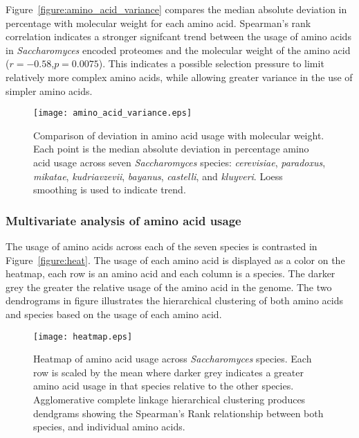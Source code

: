 Figure~\vref{figure:amino_acid_variance} compares the median absolute deviation in percentage with molecular weight for each amino acid. Spearman's rank correlation indicates a stronger signifcant trend between the usage of amino acids in \emph{Saccharomyces} encoded proteomes and the molecular weight of the amino acid ($r = - 0.58$,$p = 0.0075$). This indicates a possible selection pressure to limit relatively more complex amino acids, while allowing greater variance in the use of simpler amino acids.

\begin{figure}
  \centering
  \texttt{[image: amino\_acid\_variance.eps]}
  \caption[Comparison of deviation in amino acid usage with molecular weight]{Comparison of deviation in amino acid usage with molecular weight. Each point is the median absolute deviation in percentage amino acid usage across seven \emph{Saccharomyces} species: \emph{cerevisiae}, \emph{paradoxus}, \emph{mikatae}, \emph{kudriavzevii}, \emph{bayanus}, \emph{castelli}, and \emph{kluyveri}. Loess smoothing is used to indicate trend.}
  \label{figure:amino_acid_variance}
\end{figure}

\subsubsection{Multivariate analysis of amino acid usage}

The usage of amino acids across each of the seven species is contrasted in Figure~\vref{figure:heat}. The usage of each amino acid is displayed as a color on the heatmap, each row is an amino acid and each column is a species. The darker grey the greater the relative usage of the amino acid in the genome. The two dendrograms in figure illustrates the hierarchical clustering of both amino acids and species based on the usage of each amino acid.

\begin{figure}
  \centering
  \texttt{[image: heatmap.eps]}
  \caption[Heatmap of amino acid usage across \emph{Saccharomyces} species]{Heatmap of amino acid usage across \emph{Saccharomyces} species. Each row is scaled by the mean where darker grey indicates a greater amino acid usage in that species relative to the other species. Agglomerative complete linkage hierarchical clustering produces dendgrams showing the Spearman's Rank relationship between both species, and individual amino acids.}
  \label{figure:heat}
\end{figure}

